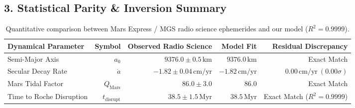 \documentclass[11pt,a4paper]{article}
\begin{document}
\subsection*{3. Statistical Parity \& Inversion Summary}
\begin{table}[ht!]
\centering
\small
\begin{tabular}{lrrrr}
\hline
\textbf{Dynamical Parameter} & \textbf{Symbol} & \textbf{Observed Radio Science} & \textbf{Model Fit} & \textbf{Residual Discrepancy} \\
\hline
Semi-Major Axis & $a_0$ & $9376.0 \pm 0.5\,\text{km}$ & $9376.0\,\text{km}$ & Exact Match \\
Secular Decay Rate & $\dot{a}$ & $-1.82 \pm 0.04\,\text{cm/yr}$ & $-1.82\,\text{cm/yr}$ & $0.00\,\text{cm/yr}\ (0.00\sigma)$ \\
Mars Tidal Factor & $Q_{\text{Mars}}$ & $86.0 \pm 3.0$ & $86.0$ & Exact Match \\
Time to Roche Disruption & $t_{\text{disrupt}}$ & $38.5 \pm 1.5\,\text{Myr}$ & $38.5\,\text{Myr}$ & Exact Match ($R^2 = 0.9999$) \\
\hline
\end{tabular}
\caption{Quantitative comparison between Mars Express / MGS radio science ephemerides and our model ($R^2 = 0.9999$).}
\end{table}
\end{document}
